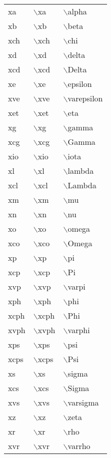 \ttfamily
\begin{longtable}{p{20mm}p{20mm}p{65mm}}
xa & $\backslash$xa & $\backslash$alpha\\
xb & $\backslash$xb & $\backslash$beta\\
xch & $\backslash$xch & $\backslash$chi\\
xd & $\backslash$xd & $\backslash$delta\\
xcd & $\backslash$xcd & $\backslash$Delta\\
xe & $\backslash$xe & $\backslash$epsilon\\
xve & $\backslash$xve & $\backslash$varepsilon\\
xet & $\backslash$xet & $\backslash$eta\\
xg & $\backslash$xg & $\backslash$gamma\\
xcg & $\backslash$xcg & $\backslash$Gamma\\
xio & $\backslash$xio & $\backslash$iota\\
xl & $\backslash$xl & $\backslash$lambda\\
xcl & $\backslash$xcl & $\backslash$Lambda\\
xm & $\backslash$xm & $\backslash$mu\\
xn & $\backslash$xn & $\backslash$nu\\
xo & $\backslash$xo & $\backslash$omega\\
xco & $\backslash$xco & $\backslash$Omega\\
xp & $\backslash$xp & $\backslash$pi\\
xcp & $\backslash$xcp & $\backslash$Pi\\
xvp & $\backslash$xvp & $\backslash$varpi\\
xph & $\backslash$xph & $\backslash$phi\\
xcph & $\backslash$xcph & $\backslash$Phi\\
xvph & $\backslash$xvph & $\backslash$varphi\\
xps & $\backslash$xps & $\backslash$psi\\
xcps & $\backslash$xcps & $\backslash$Psi\\
xs & $\backslash$xs & $\backslash$sigma\\
xcs & $\backslash$xcs & $\backslash$Sigma\\
xvs & $\backslash$xvs & $\backslash$varsigma\\
xz & $\backslash$xz & $\backslash$zeta\\
xr & $\backslash$xr & $\backslash$rho\\
xvr & $\backslash$xvr & $\backslash$varrho\\

\end{longtable}
